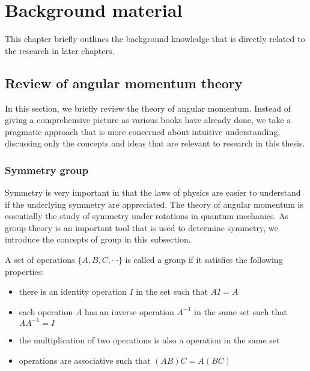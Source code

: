 
\chapter{Background material}
\label{ch:background}
This chapter  briefly outlines the background knowledge that is directly related to the research in later chapters.


\section{Review of angular momentum theory}
\label{sec:reviewAngularMomentum}

In this section, we briefly review the theory of angular momentum. Instead of giving a comprehensive 
picture as various books\cite{edmonds-book, rose-book, brink-book, zare-book, silver-book, kleinman-book, Varshalovich-book, sakurai-book, RotSpect} have already done, we take a pragmatic approach that is more concerned about intuitive 
understanding, discussing only the concepts and ideas that are relevant to research in this thesis. 

\subsection{Symmetry group}  
\label{sec:groupTheory}

Symmetry is very important in that the laws of physics are easier to understand if the underlying symmetry are 
appreciated. The theory of angular momentum is essentially the study of symmetry under rotations in quantum mechanics. 
As group theory is an important tool that is used to determine symmetry, we introduce the concepts of group
 in this subsection.

A set of operations $\{ A, B, C, \cdots \}$ is called a group if it satisfies the following properties:
\begin{itemize}
\item there is an identity operation $I$ in the set such that $A I = A$
\item  each operation $A$ has an inverse operation $A^{-1}$ in the same set such that $A A^{-1} = I$
\item  the multiplication of two operations is also a operation in the same set
\item  operations are associative such that $(AB)C = A(BC)$
\end{itemize}

